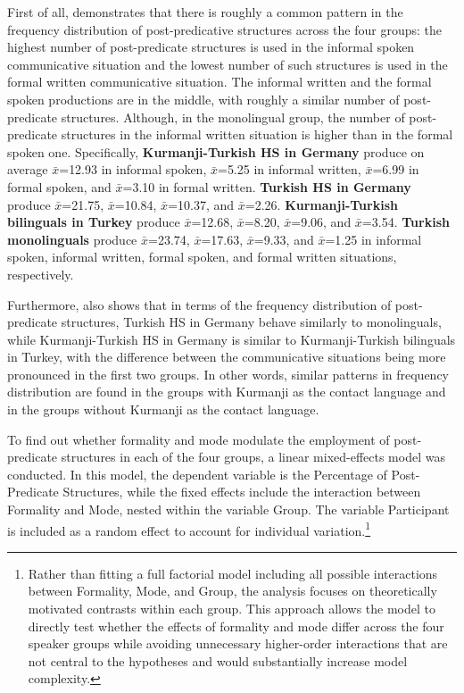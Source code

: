 First of all,  demonstrates that there is roughly a common pattern in the frequency distribution of post-predicative structures across the four groups: the highest number of post-predicate structures is used in the informal spoken communicative situation and the lowest number of such structures is used in the formal written communicative situation. The informal written and the formal spoken productions are in the middle, with roughly a similar number of post-predicate structures. Although, in the monolingual group, the number of post-predicate structures in the informal written situation is higher than in the formal spoken one. Specifically, \textbf{\textmd{Kurmanji-Turkish HS in Germany}} produce on average $\bar{x}$={12.93} in informal spoken, $\bar{x}$={5.25} in informal written, $\bar{x}$={6.99} in formal spoken, and $\bar{x}$={3.10} in formal written. \textbf{\textmd{Turkish HS in Germany}} produce $\bar{x}$={21.75}, $\bar{x}$={10.84}, $\bar{x}$={10.37}, and $\bar{x}$={2.26}. \textbf{\textmd{Kurmanji-Turkish bilinguals in Turkey}} produce $\bar{x}$={12.68}, $\bar{x}$={8.20}, $\bar{x}$={9.06}, and $\bar{x}$={3.54}. \textbf{\textmd{Turkish monolinguals}} produce $\bar{x}$={23.74}, $\bar{x}$={17.63}, $\bar{x}$={9.33}, and $\bar{x}$={1.25} in informal spoken, informal written, formal spoken, and formal written situations, respectively.


Furthermore,  also shows that in terms of the frequency distribution of post-predicate structures, Turkish HS in Germany behave similarly to monolinguals, while Kurmanji-Turkish HS in Germany is similar to Kurmanji-Turkish bilinguals in Turkey, with the difference between the communicative situations being more pronounced in the first two groups. In other words, similar patterns in frequency distribution are found in the groups with Kurmanji as the contact language and in the groups without Kurmanji as the contact language.

To find out whether formality and mode modulate the employment of post-predicate structures in each of the four groups, a linear mixed-effects model was conducted. In this model, the dependent variable is the Percentage of Post-Predicate Structures, while the fixed effects include the interaction between Formality and Mode, nested within the variable Group. The variable Participant is included as a random effect to account for individual variation.\footnote{Rather than fitting a full factorial model including all possible interactions between Formality, Mode, and Group, the analysis focuses on theoretically motivated contrasts within each group. This approach allows the model to directly test whether the effects of formality and mode differ across the four speaker groups while avoiding unnecessary higher-order interactions that are not central to the hypotheses and would substantially increase model complexity.}


